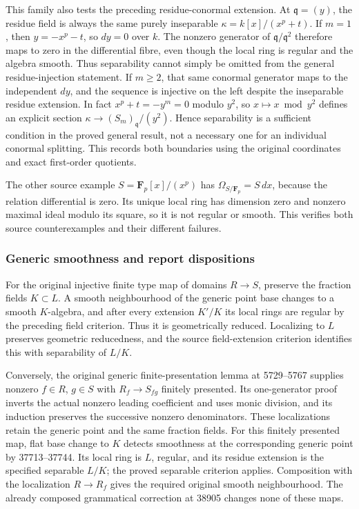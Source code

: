 This family also tests the preceding residue-conormal extension. At \(\mathfrak q=(y)\), the residue field is always the same purely inseparable \(\kappa=k[x]/(x^p+t)\). If \(m=1\), then \(y=-x^p-t\), so \(dy=0\) over \(k\). The nonzero generator of \(\mathfrak q/\mathfrak q^2\) therefore maps to zero in the differential fibre, even though the local ring is regular and the algebra smooth. Thus separability cannot simply be omitted from the general residue-injection statement. If \(m\ge2\), that same conormal generator maps to the independent \(dy\), and the sequence is injective on the left despite the inseparable residue extension. In fact \(x^p+t=-y^m=0\) modulo \(y^2\), so \(x\mapsto x\bmod y^2\) defines an explicit section \(\kappa\to(S_m)_{\mathfrak q}/(y^2)\). Hence separability is a sufficient condition in the proved general result, not a necessary one for an individual conormal splitting. This records both boundaries using the original coordinates and exact first-order quotients.

The other source example \(S=\mathbf F_p[x]/(x^p)\) has \(\Omega_{S/\mathbf F_p}=S\,dx\), because the relation differential is zero. Its unique local ring has dimension zero and nonzero maximal ideal modulo its square, so it is not regular or smooth. This verifies both source counterexamples and their different failures.

\subsubsection{Generic smoothness and report dispositions}\label{algebra-proof-049-generic-smoothness-and-report-dispositions}

For the original injective finite type map of domains \(R\to S\), preserve the fraction fields \(K\subset L\). A smooth neighbourhood of the generic point base changes to a smooth \(K\)-algebra, and after every extension \(K'/K\) its local rings are regular by the preceding field criterion. Thus it is geometrically reduced. Localizing to \(L\) preserves geometric reducedness, and the source field-extension criterion identifies this with separability of \(L/K\).

Conversely, the original generic finite-presentation lemma at 5729--5767 supplies nonzero \(f\in R\), \(g\in S\) with \(R_f\to S_{fg}\) finitely presented. Its one-generator proof inverts the actual nonzero leading coefficient and uses monic division, and its induction preserves the successive nonzero denominators. These localizations retain the generic point and the same fraction fields. For this finitely presented map, flat base change to \(K\) detects smoothness at the corresponding generic point by 37713--37744. Its local ring is \(L\), regular, and its residue extension is the specified separable \(L/K\); the proved separable criterion applies. Composition with the localization \(R\to R_f\) gives the required original smooth neighbourhood. The already composed grammatical correction at 38905 changes none of these maps.

